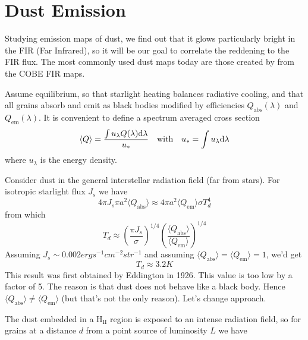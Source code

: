 \section{Dust Emission}

Studying emission maps of dust, we find out that it glows particularly bright in the FIR (Far Infrared), so it will be our goal to correlate the reddening to the FIR flux. The most commonly used dust maps today are those created by \cite{1998ApJ...500..525S} from the COBE FIR maps.
\par Assume equilibrium, so that starlight heating balances radiative cooling, and that all grains absorb and emit as black bodies modified by efficiencies $Q_{\text{abs}}(\lambda)$ and $Q_{\text{em}}(\lambda)$. It is convenient to define a spectrum averaged cross section 
\begin{equation*}
    \langle Q \rangle = \frac{\int u_{\lambda}Q(\lambda)\text{d}\lambda}{u_{*}} \quad \text{with} \quad u_{*} = \int u_{\lambda}\text{d}\lambda
\end{equation*}
where $u_{\lambda}$ is the energy density.
\par Consider dust in the general interstellar radiation field (far from stars). For isotropic starlight flux $J_{s}$ we have 
\begin{equation*}
    4\pi J_{s}\pi a^{2}\langle Q_{\text{abs}} \rangle \approx 4\pi a^{2} \langle Q_{\text{em}} \rangle\sigma T_{d}^{4}
\end{equation*}
from which 
\begin{equation*}
    T_{d} \approx \left(\frac{\pi J_{s}}{\sigma}\right)^{1/4}\left(\frac{\langle Q_{\text{abs}} \rangle}{\langle Q_{\text{em}} \rangle}\right)^{1/4}
\end{equation*}
Assuming $J_{s}\sim 0.002 \unit{erg}\unit{s}^{-1}\unit{cm}^{-2}\unit{str}^{-1}$ and assuming $\langle Q_{\text{abs}} \rangle = \langle Q_{\text{em}} \rangle = 1$, we'd get 
\begin{equation*}
    T_{d} \approx 3.2\unit{K}
\end{equation*}
This result was first obtained by Eddington in 1926. This value is too low by a factor of 5. The reason is that dust does not behave like a black body. Hence $\langle Q_{\text{abs}} \rangle \neq \langle Q_{\text{em}} \rangle$ (but that's not the only reason). Let's change approach.
\par The dust embedded in a H$_{\text{II}}$ region is exposed to an intense radiation field, so for grains at a distance $d$ from a point source of luminosity $L$ we have 
